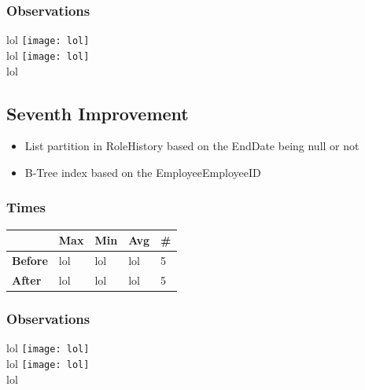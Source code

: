 \documentclass[a4paper, 10pt]{article}
\begin{document}
\subsubsection{Observations}
lol
\texttt{[image: lol]}\\ 
lol
\texttt{[image: lol]}\\
lol

\subsection{Seventh Improvement}
\begin{itemize}
  \item List partition in RoleHistory based on the EndDate being null or not
  \item B-Tree index based on the EmployeeEmployeeID
\end{itemize}
\subsubsection{Times}
\begin{table}[H]
\begin{tabular}{l|l|l|l|l|}
\cline{2-5}
\textbf{}                             & \textbf{Max} & \textbf{Min} & \textbf{Avg} & \textbf{\#}  \\ \hline
\multicolumn{1}{|l|}{\textbf{Before}} & lol         & lol         & lol          & 5            \\ \hline
\multicolumn{1}{|l|}{\textbf{After}}  & lol         & lol         & lol          & 5            \\ \hline
\end{tabular}
\end{table}
\subsubsection{Observations}
lol
\texttt{[image: lol]}\\ 
lol
\texttt{[image: lol]}\\
lol
\end{document}
